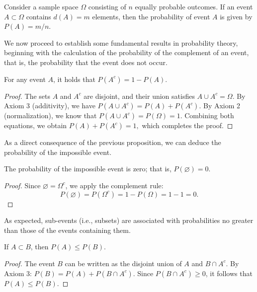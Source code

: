 \begin{example}
\label{ex:discrete_sample_space}
Consider a sample space $\Omega$ consisting of $n$ equally probable outcomes. If an event $A \subset \Omega$ contains $d(A) = m$ elements, then the probability of event $A$ is given by $P(A) = m/n$.
\end{example}

We now proceed to establish some fundamental results in probability theory, beginning with the calculation of the probability of the complement of an event, that is, the probability that the event does not occur.

\begin{proposition}
For any event $A$, it holds that $P\left( A^{c} \right) = 1 - P\left( A \right)$.
\end{proposition}

\begin{proof}
The sets $A$ and $A^c$ are disjoint, and their union satisfies $A \cup A^c = \Omega$. By Axiom 3 (additivity), we have $
P\left( A \cup A^c \right) = P\left( A \right) + P\left( A^c \right)$. By Axiom 2 (normalization), we know that $P\left( A \cup A^c \right) = P(\Omega) = 1$. Combining both equations, we obtain $P\left( A \right) + P\left( A^c \right) = 1,
$ which completes the proof.
\end{proof}

As a direct consequence of the previous proposition, we can deduce the probability of the impossible event.

\begin{proposition}
The probability of the impossible event is zero; that is, $P\left( \varnothing \right) = 0$.
\end{proposition}
\begin{proof}
Since $\varnothing = \Omega^c$, we apply the complement rule:
\[
P\left( \varnothing \right) = P\left( \Omega^c \right) = 1 - P\left( \Omega \right) = 1 - 1 = 0.
\]
\end{proof}

As expected, sub-events (i.e., subsets) are associated with probabilities no greater than those of the events containing them.

\begin{proposition}
If $A \subset B$, then $P\left( A \right) \leq P\left( B \right)$.
\end{proposition}
\begin{proof}
The event $B$ can be written as the disjoint union of $A$ and $B \cap A^c$. By Axiom 3: $P\left( B \right) = P\left( A \right) + P\left( B \cap A^c \right)$. Since $P\left( B \cap A^c \right) \geq 0$, it follows that $P\left( A \right) \leq P\left( B \right)$.
\end{proof}

